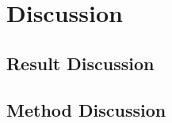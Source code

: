 \chapter{Discussion}
\label{sec:discussion}

\section{Result Discussion}


\medskip\lipsum[1]

\section{Method Discussion}


\medskip\lipsum[1]